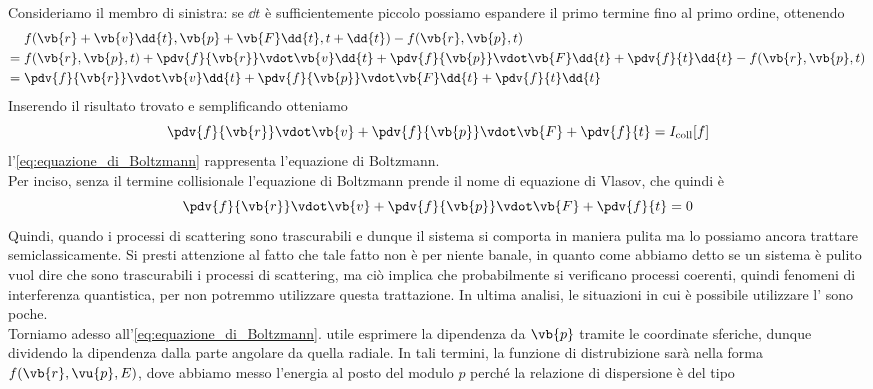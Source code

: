 Consideriamo il membro di sinistra: se $\dd{t}$ è sufficientemente piccolo possiamo espandere il primo termine fino al primo ordine, ottenendo
\begin{equation*}
    \begin{split}
        & \hspace{0.1cm} f(\vb{r} + \vb{v} \dd{t}, \vb{p} + \vb{F} \dd{t}, t + \dd{t}) - f(\vb{r}, \vb{p}, t)
        \\
        = & \hspace{0.1cm} f(\vb{r}, \vb{p}, t) + \pdv{f}{\vb{r}} \vdot \vb{v} \dd{t} + \pdv{f}{\vb{p}} \vdot \vb{F} \dd{t} + \pdv{f}{t} \dd{t} - f(\vb{r}, \vb{p}, t)
        \\
        = & \hspace{0.1cm} \pdv{f}{\vb{r}} \vdot \vb{v} \dd{t} + \pdv{f}{\vb{p}} \vdot \vb{F} \dd{t} + \pdv{f}{t} \dd{t}
    \end{split}
\end{equation*}
Inserendo il risultato trovato e semplificando otteniamo
\begin{equation}
    \pdv{f}{\vb{r}} \vdot \vb{v} + \pdv{f}{\vb{p}} \vdot \vb{F} + \pdv{f}{t}
    =I_{\rm coll}[f]
    \label{eq:equazione_di_Boltzmann}
\end{equation}
l'\eqref{eq:equazione_di_Boltzmann} rappresenta l'equazione di Boltzmann.\\
Per inciso, senza il termine collisionale l'equazione di Boltzmann prende il nome di equazione di Vlasov, che quindi è
\begin{equation}
    \pdv{f}{\vb{r}} \vdot \vb{v} + \pdv{f}{\vb{p}} \vdot \vb{F} + \pdv{f}{t}
    =0
    \label{eq:equazione_di_Vlasov}
\end{equation}
Quindi, quando i processi di scattering sono trascurabili e dunque il sistema si comporta in maniera pulita ma lo possiamo ancora trattare semiclassicamente. Si presti attenzione al fatto che tale fatto non è per niente banale, in quanto come abbiamo detto se un sistema è pulito vuol dire che sono trascurabili i processi di scattering, ma ciò implica che probabilmente si verificano processi coerenti, quindi fenomeni di interferenza quantistica, per non potremmo utilizzare questa trattazione. In ultima analisi, le situazioni in cui è possibile utilizzare l' sono poche.\\
Torniamo adesso all'\eqref{eq:equazione_di_Boltzmann}. \E utile esprimere la dipendenza da $\vb{p}$ tramite le coordinate sferiche, dunque dividendo la dipendenza dalla parte angolare da quella radiale. In tali termini, la funzione di distrubizione sarà nella forma $f(\vb{r},\vu{p},E)$, dove abbiamo messo l'energia al posto del modulo $p$ perché la relazione di dispersione è del tipo
